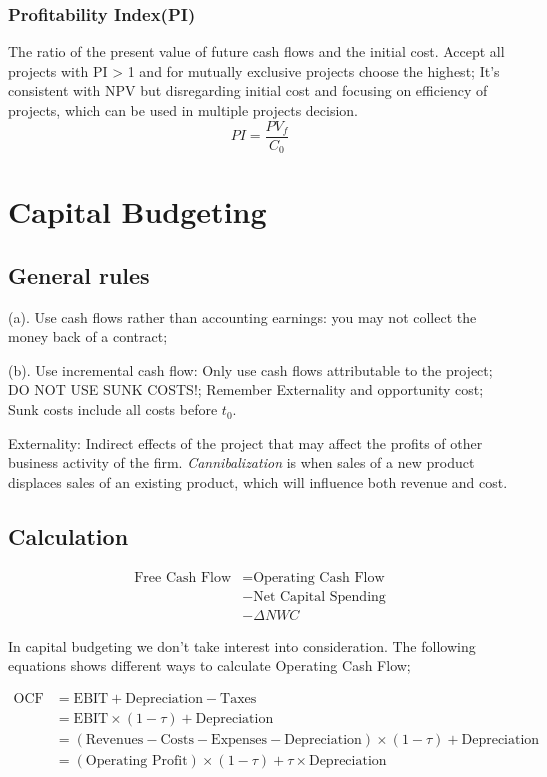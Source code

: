 \documentclass[10pt, a4paper]{article}
\begin{document}
            \subsubsection{Profitability Index(PI)}
                The ratio of the present value of future cash flows and the initial cost. Accept all projects with PI > 1 and for mutually exclusive projects choose the highest; It's consistent with NPV but disregarding initial cost and focusing on efficiency of projects, which can be used in multiple projects decision. 
                $$PI = \frac{PV_f}{C_0}$$
\newpage
    \section{Capital Budgeting}

    \subsection{General rules} 
    
        \quad(a). Use cash flows rather than accounting earnings: you may not collect the money back of a contract; 
        
        \quad(b). Use incremental cash flow: Only use cash flows attributable to the project; DO NOT USE SUNK COSTS!; Remember Externality and opportunity cost; Sunk costs include all costs before $t_0$. 
    
        Externality: Indirect effects of the project that may affect the profits of other business activity of the firm. \emph{Cannibalization} is when sales of a new product displaces sales of an existing product, which will influence both revenue and cost.

    \subsection{Calculation} 
    \begin{align*}
        \text{Free Cash Flow} &= \text{Operating Cash Flow}\\
            &- \text{Net Capital Spending} \\
            &- \Delta NWC
    \end{align*}

    In capital budgeting we don't take interest into consideration. The following equations shows different ways to calculate Operating Cash Flow;  

    \begin{align*}
        \text{OCF} &= \text{EBIT} + \text{Depreciation} - \text{Taxes}\\
        &= \text{EBIT} \times (1 - \tau) + \text{Depreciation} \\
        &= (\text{Revenues} - \text{Costs} - \text{Expenses} - \text{Depreciation}) \times (1 - \tau) + \text{Depreciation} \\
        &= (\text{Operating Profit}) \times (1 - \tau) + \tau \times \text{Depreciation}  
    \end{align*}
    
\end{document}
